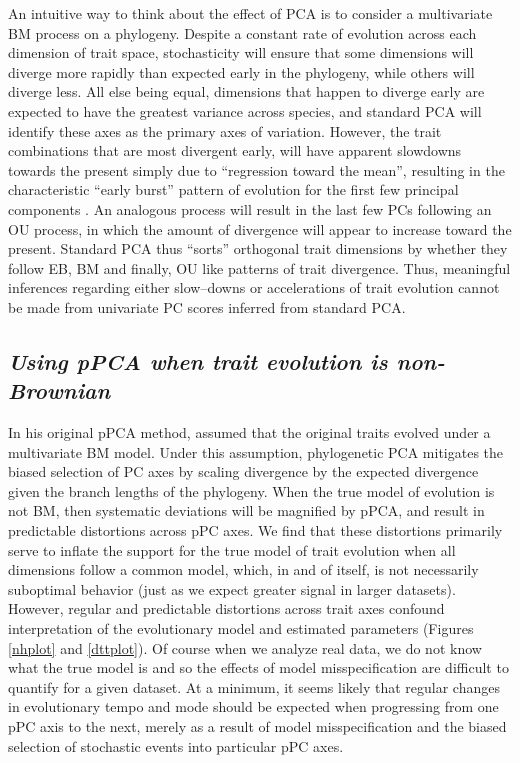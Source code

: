 \documentclass[a4paper,12pt]{article}
\begin{document}
An intuitive way to think about the effect of PCA is to consider a multivariate BM process on a phylogeny. Despite a constant rate of evolution across each dimension of trait space, stochasticity will ensure that some dimensions will diverge more rapidly than expected early in the phylogeny, while others will diverge less. All else being equal, dimensions that happen to diverge early are expected to have the greatest variance across species, and standard PCA will identify these axes as the primary axes of variation. However, the trait combinations that are most divergent early, will have apparent slowdowns towards the present simply due to ``regression toward the mean'', resulting in the characteristic ``early burst'' pattern of evolution for the first few principal components \citep[for a related point in the context of models of lineage diversification, see][]{Pennell2012}. An analogous process will result in the last few PCs following an OU process, in which the amount of divergence will appear to increase toward the present. Standard PCA thus ``sorts'' orthogonal trait dimensions by whether they follow EB, BM and finally, OU like patterns of trait divergence. Thus, meaningful inferences regarding either slow--downs or accelerations of trait evolution cannot be made from univariate PC scores inferred from standard PCA. 

\subsection{\emph{Using pPCA when trait evolution is non-Brownian}}
In his original pPCA method, \citet{Revell2008} assumed that the original traits evolved under a multivariate BM model. Under this assumption, phylogenetic PCA mitigates the biased selection of PC axes by scaling divergence by the expected divergence given the branch lengths of the phylogeny. When the true model of evolution is not BM, then systematic deviations will be magnified by pPCA, and result in predictable distortions across pPC axes. We find that these distortions primarily serve to inflate the support for the true model of trait evolution when all dimensions follow a common model, which, in and of itself, is not necessarily suboptimal behavior (just as we expect greater signal in larger datasets). However, regular and predictable distortions across trait axes confound interpretation of the evolutionary model and estimated parameters (Figures \ref{nhplot} and \ref{dttplot}). Of course when we analyze real data, we do not know what the true model is and so the effects of model misspecification are difficult to quantify for a given dataset. At a minimum, it seems likely that regular changes in evolutionary tempo and mode should be expected when progressing from one pPC axis to the next, merely as a result of model misspecification and the biased selection of stochastic events into particular pPC axes.
\end{document}

